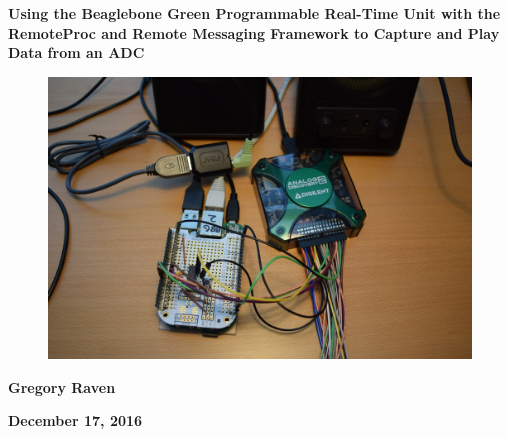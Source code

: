 \thispagestyle{empty}
{\centering\bfseries\color{black}\Huge
Using the Beaglebone Green Programmable Real-Time Unit with the RemoteProc and Remote Messaging Framework to Capture and Play Data from an ADC
\par}

\bigskip

\begin{figure}
	\centering
	\includegraphics[width=\textwidth]{photos/DSC_0021}
\end{figure}

\bigskip
{\centering\bfseries\Large
Gregory Raven
\par}


\bigskip
{\centering\bfseries\LARGE
December 17, 2016
\par}




